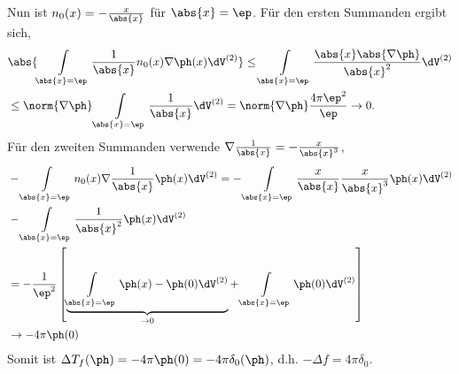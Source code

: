 \begin{bsp}
\begin{enumerate}[label=\arabic{*}.)]
\begin{enumerate}[label=\alph{*})]
Nun ist $n_0(x) = -\frac{x}{\abs{x}}$ für $\abs{x}=\ep$. Für den ersten
Summanden ergibt sich,
\begin{align*}
&\abs{\int\limits_{\abs{x}=\ep}
\frac{1}{\abs{x}}n_0(x) \nabla\ph(x) \dV^{(2)}} \le
\int\limits_{\abs{x}=\ep} \frac{\abs{x}\abs{\nabla \ph}}{\abs{x}^2}\dV^{(2)}\\
&\le \norm{\nabla \ph} \int\limits_{\abs{x}=\ep} \frac{1}{\abs{x}}\dV^{(2)} =
\norm{\nabla \ph}\frac{4\pi\ep^2}{\ep} \to 0.
\end{align*}
Für den zweiten Summanden verwende $\nabla \frac{1}{\abs{x}} =
-\frac{x}{\abs{x}^3}$,
\begin{align*}
&-\int\limits_{\abs{x}=\ep}
n_0(x)\nabla\frac{1}{\abs{x}}\ph(x)\dV^{(2)}
= -\int\limits_{\abs{x}=\ep}
\frac{x}{\abs{x}}\frac{x}{\abs{x}^3}\ph(x)\dV^{(2)}\\
&-\int\limits_{\abs{x}=\ep}
\frac{1}{\abs{x}^2}\ph(x)\dV^{(2)}\\
&= -\frac{1}{\ep^2}\left[ 
\underbrace{\int\limits_{\abs{x}=\ep}
\ph(x)-\ph(0)\dV^{(2)}}_{\to 0}
+ \int\limits_{\abs{x}=\ep}
\ph(0)\dV^{(2)}
 \right]\\
 &\to -4\pi \ph(0)
\end{align*}
Somit ist $\Delta T_f(\ph) = -4\pi\ph(0) = -4\pi \delta_0(\ph)$, d.h. $-\Delta
f = 4\pi\delta_0$.\bsphere
\end{enumerate}
\end{enumerate}
\end{bsp}

